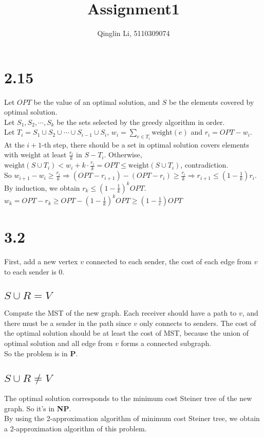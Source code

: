 \documentclass[12pt]{article}
\date{}
\title{Assignment1}
\author{Qinglin Li, 5110309074}
\begin{document}
\maketitle

\section*{2.15}
Let $OPT$ be the value of an optimal solution, and $S$ be the elements covered by optimal solution.\\
Let $S_1, S_2, \cdots, S_k$ be the sets selected by the greedy algorithm in order. \\
Let $T_i = S_1\cup S_2\cup \cdots \cup S_{i-1}\cup S_i$, $w_i = \sum_{e\in T_i} \text{weight}(e)$ and $r_i = OPT-w_i$.\\
At the $i+1$-th step, there should be a set in optimal solution covers elements with weight at least $\frac{r_i}{k}$ in $S-T_i$. Otherwise, $\text{weight}(S\cup T_i)<w_i + k\cdot\frac{r_i}{k}=OPT\leq\text{weight}(S\cup T_i)$, contradiction.\\
So $w_{i+1} - w_i \geq \frac{r_i}{k} \Rightarrow (OPT-r_{i+1}) - (OPT-r_i)\geq \frac{r_i}{k}\Rightarrow r_{i+1}\leq (1-\frac{1}{k})r_i$.\\
By induction, we obtain $r_k\leq (1-\frac{1}{k})^kOPT$.\\
$w_k=OPT-r_k\geq OPT-(1-\frac{1}{k})^kOPT\geq(1-\frac{1}{e})OPT$

\section*{3.2}
First, add a new vertex $v$ connected to each sender, the cost of each edge from $v$ to each sender is $0$.
\subsection*{$S\cup R=V$}
Compute the MST of the new graph. Each receiver should have a path to $v$, and there must be a sender in the path since $v$ only connects to senders. The cost of the optimal solution should be at least the cost of MST, because the union of optimal solution and all edge from $v$ forms a connected subgraph.\\
So the problem is in \textbf{P}.
\subsection*{$S\cup R\neq V$}
The optimal solution corresponds to the minimum cost Steiner tree of the new graph. So it's in \textbf{NP}.\\
By using the 2-approximation algorithm of minimum cost Steiner tree, we obtain a 2-approximation algorithm of this problem.
\end{document}
